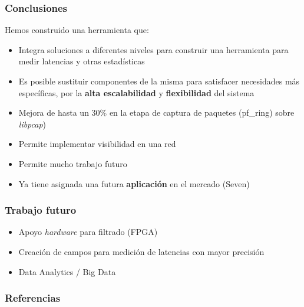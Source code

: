 \documentclass{beamer}
\begin{document}

\begin{frame}
\frametitle{Conclusiones}
Hemos construido una herramienta que:

\begin{itemize}
	\item Integra soluciones a diferentes niveles para construir una herramienta para medir latencias y otras estadísticas
	\item Es posible sustituir componentes de la misma para satisfacer necesidades más específicas, por la \textbf{alta escalabilidad} y \textbf{flexibilidad} del sistema
	\item Mejora de hasta un 30\% en la etapa de captura de paquetes (pf\_ring) sobre \textit{libpcap})
	\item Permite implementar visibilidad en una red
	\item Permite mucho trabajo futuro
	\item Ya tiene asignada una futura \textbf{aplicación} en el mercado (Seven)
\end{itemize}

\end{frame}


\begin{frame}
\frametitle{Trabajo futuro}
\begin{itemize}
	\item Apoyo \textit{hardware} para filtrado (FPGA)
	\item Creación de campos para medición de latencias con mayor precisión
	\item Data Analytics / Big Data
\end{itemize}

\end{frame}


\begin{frame}
\frametitle{Referencias}
\footnotesize{
\begin{thebibliography}{99} %
\end{thebibliography}
}
\end{frame}

\end{document}
